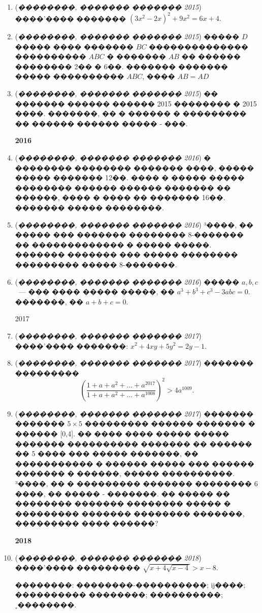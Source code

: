 \documentclass[a4paper,12pt]{article}
\begin{document}
\begin{enumerate}
\item (\textit{��������, ������� ������� 2015}) ����'���� ������� $(3x^{2}-2x)^{2}+9x^{2}=6x+4.$

\item (\textit{��������, ������� ������� 2015}) ����� $D$ ����� ���� ������� $BC$ �������������� ���������� $ABC$ � ������� $AB$ �� ������ �������� 2�� � 6��. ������� ������� ����� ���������� $ABC$, ���� $AB=AD$

\item (\textit{��������, ������� ������� 2015}) �� ������� ������ ������ 2015 �������� � 2015 ����. �������, �� � ������ � ��������� �� ������ ������ ����� - ���.


\textbf{2016}


\item (\textit{��������, ������� ������� 2016}) � �������� �������� ������� ����, ����� ����� ������� 12��. ���� � ����� ����� �������� ������ ������ ������� �� ������, ���� � ���� �� ������� 16��. ������� ����� ��������.

\item (\textit{��������, ������� ������� 2016}) ³����, �� ����� ��� ������� �������� 8-������� �� ������������� � ����� �����. ������� ������� ��� ����� �������� ��������� ����� 8-�������.

\item (\textit{��������, ������� ������� 2016}) ����� $a,b,c$~--- ��� ���� ����� �����, �� $a^{3}+b^{3}+c^{3}-3abc=0.$ �������, �� $a+b+c=0.$

2017


\item (\textit{��������, ������� ������� 2017}) ����'���� �������: $x^{2}+4xy+5y^{2}=2y-1.$

\item (\textit{��������, ������� ������� 2017}) ������� ��������� $$(\frac{1+a+a^{2}+...+a^{2017}}{1+a+a^{2}+...+a^{1008}})^{2}>4a^{1009}.$$

\item (\textit{��������, ������� ������� 2017}) ������� ������� $5\times 5$ ��������� ������ ������� � ������ [0,4]. �� ���� ���� ����� ����� ������� ���������� ������� �� ������ �� 5 ���� ��� ����� �������, �� ����������� � ������ ����� ��� ������ ������� � ������, ����� ����������. ³����, �� � ��������� ������� �������� 6 ����, �� ����� - �������. �� ����� �� �������� ������� �������� ����� � ��������� ������� �������� �������, ��������� ���� ������?


\textbf{2018}


\item (\textit{��������, ������� ������� 2018}) ����'���� ��������� $\sqrt{x+4\sqrt{x-4}}>x-8.$





��������: ��������-����������; ĳ����; ���������� ��������; ����������; ˳��������.

\end{enumerate}
\end{document}
